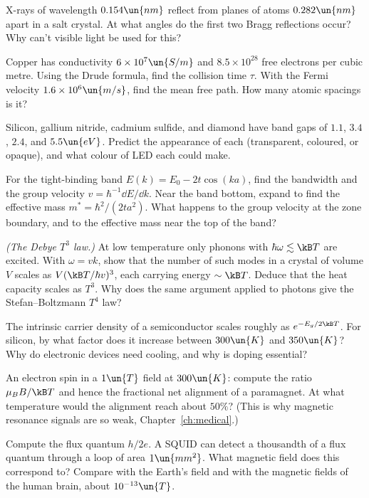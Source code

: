 \begin{problems}
\core X-rays of wavelength $0.154\un{nm}$ reflect from planes of atoms $0.282\un{nm}$ apart in a salt crystal. At what angles do the first two Bragg reflections occur? Why can't visible light be used for this?

 Copper has conductivity $6\times10^7\un{S/m}$ and $8.5\times10^{28}$ free electrons per cubic metre. Using the Drude formula, find the collision time $\tau$. With the Fermi velocity $1.6\times10^{6}\un{m/s}$, find the mean free path. How many atomic spacings is it?

\core Silicon, gallium nitride, cadmium sulfide, and diamond have band gaps of $1.1$, $3.4$, $2.4$, and $5.5\un{eV}$. Predict the appearance of each (transparent, coloured, or opaque), and what colour of LED each could make.

\core For the tight-binding band $E(k) = E_0-2t\cos(ka)$, find the bandwidth and the group velocity $v = \hbar^{-1}\dd E/\dd k$. Near the band bottom, expand to find the effective mass $m^* = \hbar^2/(2ta^2)$. What happens to the group velocity at the zone boundary, and to the effective mass near the top of the band?

\core \label{prob:debye} \emph{(The Debye $T^3$ law.)} At low temperature only phonons with $\hbar\omega\lesssim\kB T$ are excited. With $\omega = vk$, show that the number of such modes in a crystal of volume $V$ scales as $V(\kB T/\hbar v)^3$, each carrying energy $\sim\kB T$. Deduce that the heat capacity scales as $T^3$. Why does the same argument applied to photons give the Stefan--Boltzmann $T^4$ law?

 The intrinsic carrier density of a semiconductor scales roughly as $e^{-E_g/2\kB T}$. For silicon, by what factor does it increase between $300\un{K}$ and $350\un{K}$? Why do electronic devices need cooling, and why is doping essential?

 An electron spin in a $1\un{T}$ field at $300\un{K}$: compute the ratio $\mu_BB/\kB T$ and hence the fractional net alignment of a paramagnet. At what temperature would the alignment reach about $50\%$? (This is why magnetic resonance signals are so weak, Chapter~\ref{ch:medical}.)

\core Compute the flux quantum $h/2e$. A SQUID can detect a thousandth of a flux quantum through a loop of area $1\un{mm^2}$. What magnetic field does this correspond to? Compare with the Earth's field and with the magnetic fields of the human brain, about $10^{-13}\un{T}$.


\end{problems}
